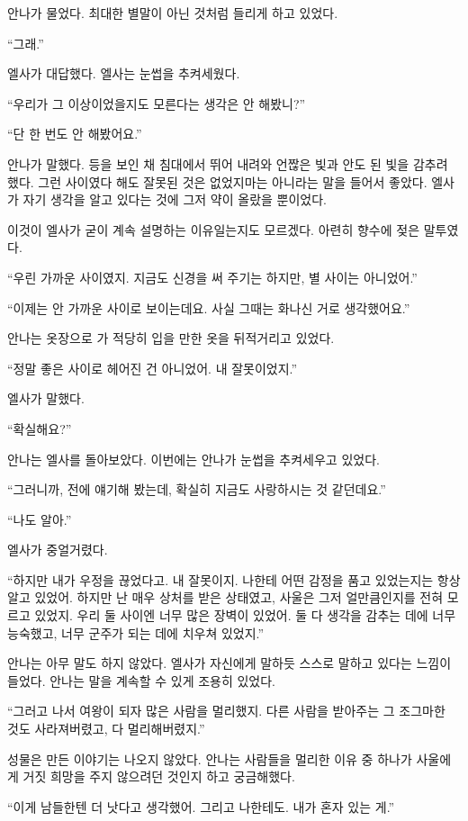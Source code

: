 안나가 물었다. 최대한 별말이 아닌 것처럼 들리게 하고 있었다.

``그래.''

엘사가 대답했다. 엘사는 눈썹을 추켜세웠다.

``우리가 그 이상이었을지도 모른다는 생각은 안 해봤니?''

``단 한 번도 안 해봤어요.''

안나가 말했다. 등을 보인 채 침대에서 뛰어 내려와 언짢은 빛과 안도 된 빛을 감추려 했다. 그런 사이였다 해도 잘못된 것은 없었지마는 아니라는 말을 들어서 좋았다. 엘사가 자기 생각을 알고 있다는 것에 그저 약이 올랐을 뿐이었다.

이것이 엘사가 굳이 계속 설명하는 이유일는지도 모르겠다. 아련히 향수에 젖은 말투였다.

``우린 가까운 사이였지. 지금도 신경을 써 주기는 하지만, 별 사이는 아니었어.''

``이제는 안 가까운 사이로 보이는데요. 사실 그때는 화나신 거로 생각했어요.''

안나는 옷장으로 가 적당히 입을 만한 옷을 뒤적거리고 있었다.

``정말 좋은 사이로 헤어진 건 아니었어. 내 잘못이었지.''

엘사가 말했다.

``확실해요?''

안나는 엘사를 돌아보았다. 이번에는 안나가 눈썹을 추켜세우고 있었다.

``그러니까, 전에 얘기해 봤는데, 확실히 지금도 사랑하시는 것 같던데요.''

``나도 알아.''

엘사가 중얼거렸다.

``하지만 내가 우정을 끊었다고. 내 잘못이지. 나한테 어떤 감정을 품고 있었는지는 항상 알고 있었어. 하지만 난 매우 상처를 받은 상태였고, 사울은 그저 얼만큼인지를 전혀 모르고 있었지. 우리 둘 사이엔 너무 많은 장벽이 있었어. 둘 다 생각을 감추는 데에 너무 능숙했고, 너무 군주가 되는 데에 치우쳐 있었지.''

안나는 아무 말도 하지 않았다. 엘사가 자신에게 말하듯 스스로 말하고 있다는 느낌이 들었다. 안나는 말을 계속할 수 있게 조용히 있었다.

``그러고 나서 여왕이 되자 많은 사람을 멀리했지. 다른 사람을 받아주는 그 조그마한 것도 사라져버렸고, 다 멀리해버렸지.''

성물은 만든 이야기는 나오지 않았다. 안나는 사람들을 멀리한 이유 중 하나가 사울에게 거짓 희망을 주지 않으려던 것인지 하고 궁금해했다.

``이게 남들한텐 더 낫다고 생각했어. 그리고 나한테도. 내가 혼자 있는 게.''

